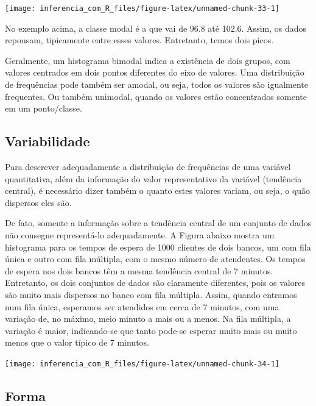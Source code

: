 \documentclass[
]{book}
\begin{document}
\begin{center}\texttt{[image: inferencia\_com\_R\_files/figure-latex/unnamed-chunk-33-1]} \end{center}

No exemplo acima, a classe modal é a que vai de 96.8 até 102.6. Assim, os dados repousam, tipicamente entre esses valores. Entretanto, temos dois picos.

Geralmente, um histograma bimodal indica a existência de dois grupos, com valores centrados em dois pontos diferentes do eixo de valores. Uma distribuição de frequências pode também ser amodal, ou seja, todos os valores são igualmente frequentes. Ou também unimodal, quando os valores estão concentrados somente em um ponto/classe.

\hypertarget{variabilidade}{%
\subsection{Variabilidade}\label{variabilidade}}

Para descrever adequadamente a distribuição de frequências de uma variável quantitativa, além da informação do valor representativo da variável (tendência central), é necessário dizer também o quanto estes valores variam, ou seja, o quão dispersos eles são.

De fato, somente a informação sobre a tendência central de um conjunto de dados não consegue representá-lo adequadamente. A Figura abaixo mostra um histograma para os tempos de espera de 1000 clientes de dois bancos, um com fila única e outro com fila múltipla, com o mesmo número de atendentes. Os tempos de espera nos dois bancos têm a mesma tendência central de 7 minutos. Entretanto, os dois conjuntos de dados são claramente diferentes, pois os valores são muito mais dispersos no banco com fila múltipla. Assim, quando entramos num fila única, esperamos ser atendidos em cerca de 7 minutos, com uma variação de, no máximo, meio minuto a mais ou a menos. Na fila múltipla, a variação é maior, indicando-se que tanto pode-se esperar muito mais ou muito menos que o valor típico de 7 minutos.

\begin{center}\texttt{[image: inferencia\_com\_R\_files/figure-latex/unnamed-chunk-34-1]} \end{center}

\hypertarget{forma}{%
\subsection{Forma}\label{forma}}
\end{document}
